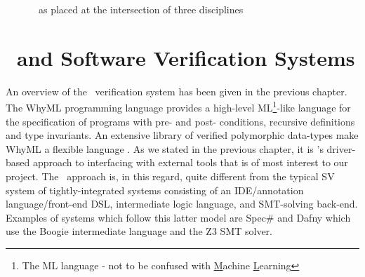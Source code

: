 \begin{figure}

\centering
\def\firstcircle{(3cm,0cm) circle (2.5cm)}
\def\secondcircle{(0cm,0cm) circle (2.5cm)}
\def\thirdcircle{(1.5cm,3cm) circle (2.5cm)}

\caption{\where~as placed at the intersection of three disciplines}
\label{fig:litreview}

\end{figure}


\section{\why~and Software Verification Systems}
\label{sec:lrsv}

An overview of the \why~verification system \cite{why:shephard,why:whereprovers} has been given in the previous chapter. The WhyML programming language provides a high-level ML\footnote{The ML language - not to be confused with \underline{M}achine \underline{L}earning}-like language for the specification of programs with pre- and post- conditions, recursive definitions and type invariants. An extensive library of verified polymorphic data-types make WhyML a flexible language \cite{verifythis,why:polymorphic}. 
As we stated in the previous chapter, it is \why's driver-based approach to interfacing with external tools that is of most interest to our project. 
The \why~approach is, in this regard, quite different from the typical SV system of tightly-integrated systems consisting of an IDE/annotation language/front-end DSL, intermediate logic language, and SMT-solving back-end. 
Examples of systems which follow this latter model are Spec\# \cite{spec} and Dafny \cite{Dafny} which use the Boogie \cite{Boogie} intermediate language and the Z3 \cite{Z3} SMT solver.

